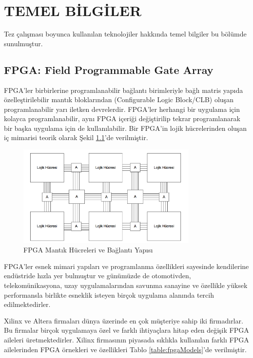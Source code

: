 \chapter{TEMEL BİLGİLER} \label{chapter:temelBilgiler}
Tez çalışması boyunca kullanılan teknolojiler hakkında temel bilgiler bu bölümde sunulmuştur.
\section{FPGA: Field Programmable Gate Array}
FPGA'ler birbirlerine programlanabilir bağlantı birimleriyle bağlı matris yapıda özelleştirilebilir mantık bloklarından (Configurable Logic Block/CLB) oluşan programlanabilir yarı iletken devrelerdir. FPGA’ler herhangi bir uygulama için kolayca programlanabilir, aynı FPGA içeriği değiştirilip tekrar programlanarak bir başka uygulama için de kullanılabilir. Bir FPGA’in lojik hücrelerinden oluşan iç mimarisi teorik olarak Şekil \ref{image:fpgaCLB}’de verilmiştir.\par
\begin{figure}[ht]
\centering
\shorthandoff{=}
\includegraphics[width=0.8\textwidth]{gorsel/fpgaCLB.png}
\shorthandoff{=}
\caption{FPGA Mantık Hücreleri ve Bağlantı Yapısı}
\label{image:fpgaCLB}
\end{figure}

FPGA'ler esnek mimari yapıları ve programlanma özellikleri sayesinde kendilerine endüstride hızla yer bulmuştur ve günümüzde de otomotivden, telekomünikasyona, uzay uygulamalarından savunma sanayine ve özellikle yüksek performansla birlikte esneklik isteyen birçok uygulama alanında tercih edilmektedirler. \cite{aykenarThesis} \par

Xilinx ve Altera firmaları dünya üzerinde en çok müşteriye sahip iki firmadırlar. Bu firmalar birçok uygulamaya özel ve farklı ihtiyaçlara hitap eden değişik FPGA aileleri üretmektedirler. Xilinx firmasının piyasada sıklıkla kullanılan farklı FPGA ailelerinden FPGA örnekleri ve özellikleri Tablo \ref{table:fpgaModels}’de verilmiştir.\par

